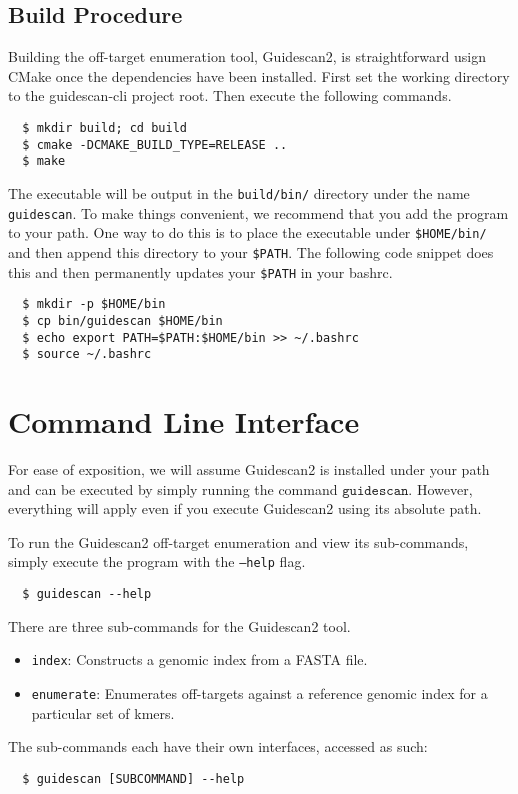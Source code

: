 \documentclass[11pt]{article}
\begin{document}
\subsection{Build Procedure}
Building the off-target enumeration tool, Guidescan2, is
straightforward usign CMake once the dependencies have been
installed. First set the working directory to the guidescan-cli
project root. Then execute the following commands.

\begin{verbatim}
  $ mkdir build; cd build
  $ cmake -DCMAKE_BUILD_TYPE=RELEASE ..
  $ make
\end{verbatim}

The executable will be output in the \texttt{build/bin/} directory
under the name \texttt{guidescan}. To make things convenient, we
recommend that you add the program to your path. One way to do this is
to place the executable under \texttt{\$HOME/bin/} and then append
this directory to your
\texttt{\$PATH}. The following code snippet does this and then
permanently updates your \texttt{\$PATH} in your bashrc.

\begin{verbatim}
  $ mkdir -p $HOME/bin
  $ cp bin/guidescan $HOME/bin
  $ echo export PATH=$PATH:$HOME/bin >> ~/.bashrc
  $ source ~/.bashrc
\end{verbatim}

\section{Command Line Interface}
For ease of exposition, we will assume Guidescan2 is installed under
your path and can be executed by simply running the command
$\texttt{guidescan}$. However, everything will apply even if you
execute Guidescan2 using its absolute path.

To run the Guidescan2 off-target enumeration and view its
sub-commands, simply execute the program with the \texttt{--help}
flag.
\begin{verbatim}
  $ guidescan --help
\end{verbatim}

There are three sub-commands for the Guidescan2 tool. 
\begin{itemize}
\item \texttt{index}: Constructs a genomic index from a FASTA file.
\item \texttt{enumerate}: Enumerates off-targets against a reference
  genomic index for a particular set of kmers. 
\end{itemize}
The sub-commands each have their own interfaces, accessed as such:
\begin{verbatim}
  $ guidescan [SUBCOMMAND] --help
\end{verbatim}
\end{document}

